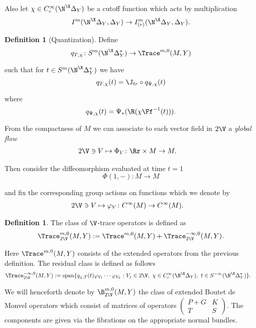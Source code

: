 \documentclass[10pt, reqno]{amsart}
\theoremstyle{definition}
\newtheorem{Def}[Thm]{Definition}
\begin{document}
Also let $\chi \in C_c^{\infty}(\N^{\X} \Delta_Y)$ be a cutoff function which acts by multiplication 
\[
I^m(\N^{\X} \Delta_Y, \Delta_Y) \to I_{(r)}^{m}(\N^{\X} \Delta_Y, \Delta_Y).
\]

\begin{Def}[Quantization]
Define
\[
q_{T, \chi} \colon S^m(\N^{\X} \Delta_Y^{\ast}) \to \Trace^{m,0}(M, Y) 
\]

such that for $t \in S^m(\N^{\X} \Delta_Y^{\ast})$ we have
\[
q_{T, \chi}(t) = \J_{tr} \circ q_{\Psi, \chi}(t)
\]

where
\[
q_{\Psi, \chi}(t) = \Psi_{\ast}(\R(\chi \Ff^{-1}(t))).
\]
\end{Def}

From the compactness of $M$ we can associate to each vector field in $2 \V$ a \emph{global flow}
\begin{align*}
& 2\V \ni V \mapsto \Phi_V \colon \Rr \times M \to M.
\end{align*}

Then consider the diffeomorphism evaluated at time $t = 1$
\[
\Phi(1, -) \colon M \to M
\]

and fix the corresponding group actions on functions which we denote by
\begin{align*}
& 2\V \ni V \mapsto \varphi_V \colon C^{\infty}(M) \to C^{\infty}(M).
\end{align*}

\begin{Def}
The class of $\V$-trace operators is defined as
\[
\Trace_{2\V}^{m,0}(M, Y) := \Trace^{m,0}(M, Y) + \Trace_{2\V}^{-\infty, 0}(M, Y).
\]

Here $\Trace^{m,0}(M, Y)$ consists of the extended operators from the previous definition.
The residual class is defined as follows
\begin{align*}
& \Trace_{2\V}^{-\infty, 0}(M, Y) := \mathrm{span}\{q_{\chi, T}(t) \varphi_{V_1} \cdots \varphi_{V_k} : V_j \in 2\V, \ \chi \in C_c^{\infty}(\N^{\X} \Delta_Y), \ t \in S^{-\infty}(\N^{\X} \Delta_Y^{\ast})\}.
\end{align*}
\end{Def}

We will henceforth denote by $\B_{2\V}^{m,0}(M, Y)$ the class of extended Boutet de Monvel operators which consist of
matrices of operators $\begin{pmatrix} P + G & K \\ T & S \end{pmatrix}$. The components are given via the fibrations on the 
appropriate normal bundles.
\end{document}
